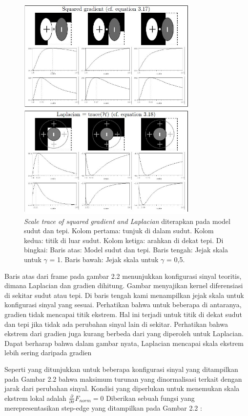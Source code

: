 \begin{figure}
  \centering{}
  \includegraphics[width=0.8\textwidth]{gambar/Scale trace.jpg}
  \caption{\emph{Scale trace of squared gradient and Laplacian} diterapkan pada model sudut dan tepi. Kolom pertama: tunjuk di dalam sudut. Kolom kedua: titik di luar sudut. Kolom ketiga: arahkan di dekat tepi. Di bingkai: Baris atas: Model sudut dan tepi. Baris tengah: Jejak skala untuk \(\gamma\) = 1. Baris bawah: Jejak skala untuk \(\gamma\) = 0,5.}
\end{figure}

Baris atas dari frame pada gambar 2.2 menunjukkan konfigurasi sinyal teoritis, dimana Laplacian dan gradien dihitung. 
Gambar menyajikan kernel diferensiasi di sekitar sudut atau tepi. Di baris tengah kami menampilkan jejak skala untuk konfigurasi 
sinyal yang sesuai. Perhatikan bahwa untuk beberapa di antaranya, gradien tidak mencapai titik ekstrem. Hal ini terjadi untuk titik di dekat sudut 
dan tepi jika tidak ada perubahan sinyal lain di sekitar. Perhatikan bahwa ekstrem dari gradien juga kurang berbeda dari yang diperoleh untuk 
Laplacian. Dapat berharap bahwa dalam gambar nyata, Laplacian mencapai skala ekstrem lebih sering daripada gradien

Seperti yang ditunjukkan untuk beberapa konfigurasi sinyal yang ditampilkan pada Gambar 2.2 bahwa maksimum turunan yang dinormalisasi terkait 
dengan jarak dari perubahan sinyal. Kondisi yang diperlukan untuk menemukan skala ekstrem lokal adalah \(\frac{\partial}{\partial \sigma}F_{norm} = 0\)
Diberikan sebuah fungsi yang merepresentasikan step-edge yang ditampilkan pada Gambar 2.2 :


